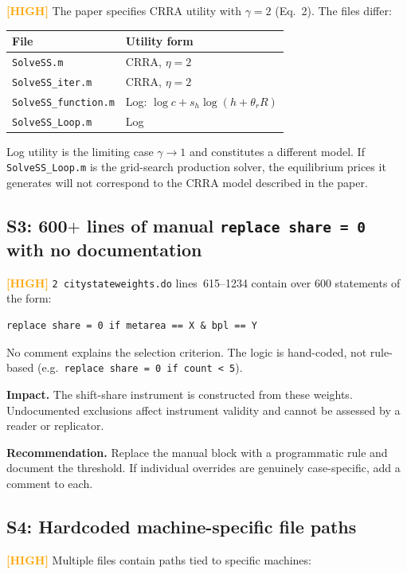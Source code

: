 \documentclass[11pt]{article}
\newcommand{\high}{\textcolor{orange}{\textbf{[HIGH]}}}
\begin{document}
\high{} The paper specifies CRRA utility with $\gamma = 2$ (Eq.~2). The files differ:

\begin{center}
\begin{tabular}{ll}
\toprule
File & Utility form \\
\midrule
\texttt{SolveSS.m}           & CRRA, $\eta = 2$ \\
\texttt{SolveSS\_iter.m}     & CRRA, $\eta = 2$ \\
\texttt{SolveSS\_function.m} & Log: $\log c + s_h \log(h + \theta_r R)$ \\
\texttt{SolveSS\_Loop.m}     & Log \\
\bottomrule
\end{tabular}
\end{center}

Log utility is the limiting case $\gamma \to 1$ and constitutes a different model.
If \texttt{SolveSS\_Loop.m} is the grid-search production solver, the equilibrium
prices it generates will not correspond to the CRRA model described in the paper.

\subsection*{S3: 600$+$ lines of manual \texttt{replace share = 0} with no documentation}

\high{} \texttt{2 citystateweights.do} lines~615--1234 contain over 600 statements of the form:
\begin{verbatim}
replace share = 0 if metarea == X & bpl == Y
\end{verbatim}
No comment explains the selection criterion. The logic is hand-coded, not
rule-based (e.g.\ \texttt{replace share = 0 if count < 5}).

\noindent\textbf{Impact.} The shift-share instrument is constructed from these weights.
Undocumented exclusions affect instrument validity and cannot be assessed by a reader
or replicator.

\noindent\textbf{Recommendation.} Replace the manual block with a programmatic rule
and document the threshold. If individual overrides are genuinely case-specific, add
a comment to each.

\subsection*{S4: Hardcoded machine-specific file paths}

\high{} Multiple files contain paths tied to specific machines:
\end{document}
